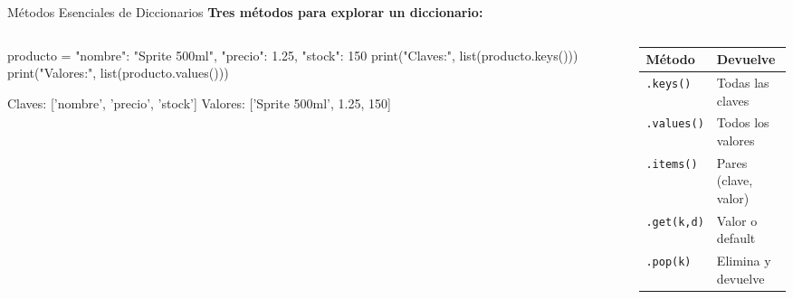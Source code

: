 \documentclass[aspectratio=169, 11pt]{beamer}
\begin{document}
\begin{frame}[fragile,shrink=30]{Métodos Esenciales de Diccionarios}
  \vspace{-6pt}
  {\small\color{arcaDark}\bfseries
    Tres métodos para explorar un diccionario:}

  \vspace{4pt}
  \begin{columns}[T]
    \begin{column}{0.50\textwidth}
      \begin{pyblock}
producto = {
    "nombre": "Sprite 500ml",
    "precio": 1.25,
    "stock": 150
}
print("Claves:", list(producto.keys()))
print("Valores:", list(producto.values()))
      \end{pyblock}
      \vspace{-2pt}
      \begin{outputblock}
Claves: ['nombre', 'precio', 'stock']
Valores: ['Sprite 500ml', 1.25, 150]
      \end{outputblock}
    \end{column}

    \begin{column}{0.46\textwidth}
      \vspace{2pt}
      {\footnotesize
      \renewcommand{\arraystretch}{1.3}
      \begin{tabular}{@{}l p{3.4cm}@{}}
        \toprule
        {\bfseries\color{arcaDark} Método} &
        {\bfseries\color{arcaDark} Devuelve} \\
        \midrule
        \texttt{.keys()}   & Todas las claves \\
        \texttt{.values()} & Todos los valores \\
        \texttt{.items()}  & Pares (clave, valor) \\
        \texttt{.get(k,d)} & Valor o default \\
        \texttt{.pop(k)}   & Elimina y devuelve \\
        \bottomrule
      \end{tabular}
      }
    \end{column}
  \end{columns}
\end{frame}
\end{document}
